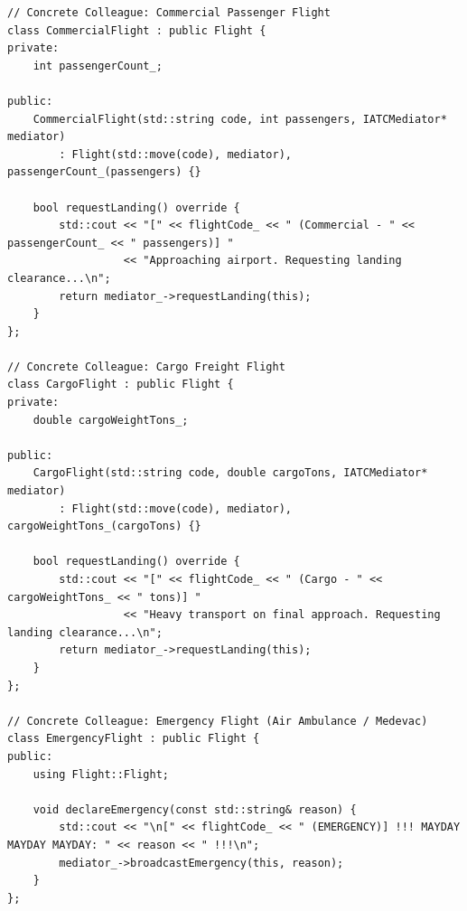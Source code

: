 \documentclass[12pt,a4paper]{article}
\begin{document}
\newpage
\begin{lstlisting}[caption={Concrete Colleagues: Commercial, Cargo, and Emergency Flights}]
// Concrete Colleague: Commercial Passenger Flight
class CommercialFlight : public Flight {
private:
    int passengerCount_;

public:
    CommercialFlight(std::string code, int passengers, IATCMediator* mediator)
        : Flight(std::move(code), mediator), passengerCount_(passengers) {}

    bool requestLanding() override {
        std::cout << "[" << flightCode_ << " (Commercial - " << passengerCount_ << " passengers)] "
                  << "Approaching airport. Requesting landing clearance...\n";
        return mediator_->requestLanding(this);
    }
};

// Concrete Colleague: Cargo Freight Flight
class CargoFlight : public Flight {
private:
    double cargoWeightTons_;

public:
    CargoFlight(std::string code, double cargoTons, IATCMediator* mediator)
        : Flight(std::move(code), mediator), cargoWeightTons_(cargoTons) {}

    bool requestLanding() override {
        std::cout << "[" << flightCode_ << " (Cargo - " << cargoWeightTons_ << " tons)] "
                  << "Heavy transport on final approach. Requesting landing clearance...\n";
        return mediator_->requestLanding(this);
    }
};

// Concrete Colleague: Emergency Flight (Air Ambulance / Medevac)
class EmergencyFlight : public Flight {
public:
    using Flight::Flight;

    void declareEmergency(const std::string& reason) {
        std::cout << "\n[" << flightCode_ << " (EMERGENCY)] !!! MAYDAY MAYDAY MAYDAY: " << reason << " !!!\n";
        mediator_->broadcastEmergency(this, reason);
    }
};
\end{lstlisting}
\end{document}
